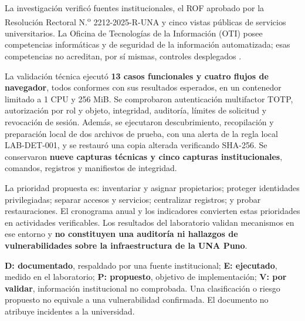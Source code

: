 \documentclass[10pt,a4paper]{article}
\begin{document}
La investigación verificó fuentes institucionales, el ROF aprobado por la Resolución Rectoral N.\textsuperscript{o} 2212-2025-R-UNA y cinco vistas públicas de servicios universitarios. La Oficina de Tecnologías de la Información (OTI) posee competencias informáticas y de seguridad de la información automatizada; esas competencias no acreditan, por sí mismas, controles desplegados \cite{R01,R02}.

La validación técnica ejecutó \textbf{13 casos funcionales y cuatro flujos de navegador}, todos conformes con sus resultados esperados, en un contenedor limitado a 1 CPU y 256 MiB. Se comprobaron autenticación multifactor TOTP, autorización por rol y objeto, integridad, auditoría, límites de solicitud y revocación de sesión. Además, se ejecutaron descubrimiento, recopilación y preparación local de dos archivos de prueba, con una alerta de la regla local LAB-DET-001, y se restauró una copia alterada verificando SHA-256. Se conservaron \textbf{nueve capturas técnicas y cinco capturas institucionales}, comandos, registros y manifiestos de integridad.

La prioridad propuesta es: inventariar y asignar propietarios; proteger identidades privilegiadas; separar accesos y servicios; centralizar registros; y probar restauraciones. El cronograma anual y los indicadores convierten estas prioridades en actividades verificables. Los resultados del laboratorio validan mecanismos en ese entorno y \textbf{no constituyen una auditoría ni hallazgos de vulnerabilidades sobre la infraestructura de la UNA Puno}.

\begin{RecuadroInforme}[title={Lectura de los resultados}]
\textbf{D: documentado}, respaldado por una fuente institucional; \textbf{E: ejecutado}, medido en el laboratorio; \textbf{P: propuesto}, objetivo de implementación; \textbf{V: por validar}, información institucional no comprobada. Una clasificación o riesgo propuesto no equivale a una vulnerabilidad confirmada. El documento no atribuye incidentes a la universidad.
\end{RecuadroInforme}
\tableofcontents
\clearpage
\listoffigures
\clearpage
{}
\end{document}
